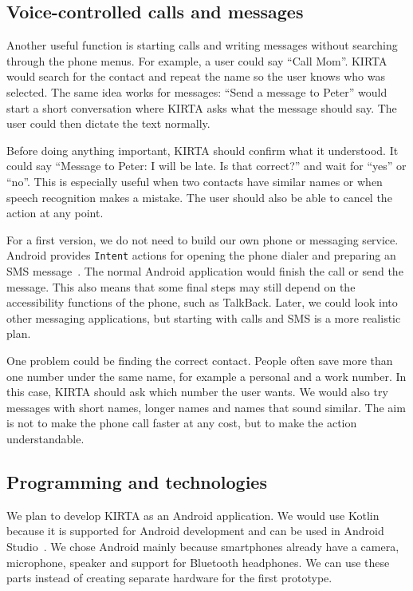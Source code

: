 \documentclass[10pt,twoside,english,a4paper]{article}
\begin{document}
\subsection*{Voice-controlled calls and messages}

Another useful function is starting calls and writing messages without searching through the phone menus. For example, a user could say ``Call Mom''. KIRTA would search for the contact and repeat the name so the user knows who was selected. The same idea works for messages: ``Send a message to Peter'' would start a short conversation where KIRTA asks what the message should say. The user could then dictate the text normally.

Before doing anything important, KIRTA should confirm what it understood. It could say ``Message to Peter: I will be late. Is that correct?'' and wait for ``yes'' or ``no''. This is especially useful when two contacts have similar names or when speech recognition makes a mistake. The user should also be able to cancel the action at any point.

For a first version, we do not need to build our own phone or messaging service. Android provides \texttt{Intent} actions for opening the phone dialer and preparing an SMS message~\cite{androidintents}. The normal Android application would finish the call or send the message. This also means that some final steps may still depend on the accessibility functions of the phone, such as TalkBack. Later, we could look into other messaging applications, but starting with calls and SMS is a more realistic plan.

One problem could be finding the correct contact. People often save more than one number under the same name, for example a personal and a work number. In this case, KIRTA should ask which number the user wants. We would also try messages with short names, longer names and names that sound similar. The aim is not to make the phone call faster at any cost, but to make the action understandable.

\subsection*{Programming and technologies}

We plan to develop KIRTA as an Android application. We would use Kotlin because it is supported for Android development and can be used in Android Studio~\cite{androidkotlin}. We chose Android mainly because smartphones already have a camera, microphone, speaker and support for Bluetooth headphones. We can use these parts instead of creating separate hardware for the first prototype.
\end{document}
